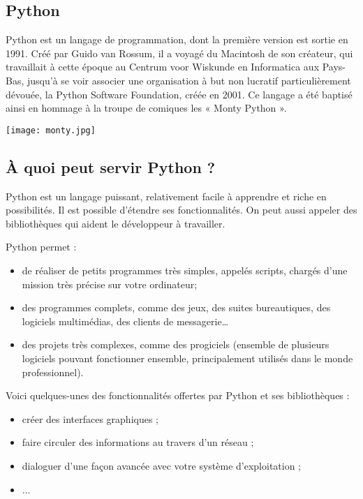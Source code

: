 \subsection{Python}
\begin{minipage}[c]{.79\linewidth}

Python est un langage de programmation, dont la première version est sortie en 1991. Créé par Guido van Rossum, il a voyagé du Macintosh de son créateur, qui travaillait à cette époque au Centrum voor Wiskunde en Informatica aux Pays-Bas, jusqu'à se voir associer une organisation à but non lucratif particulièrement dévouée, la Python Software Foundation, créée en 2001. Ce langage a été baptisé ainsi en hommage à la troupe de comiques les « Monty Python ».
\end{minipage} \hfill
\begin{minipage}[c]{.2\linewidth}
\begin{center}
\texttt{[image: monty.jpg]}
\end{center}
\end{minipage}

\subsection{À quoi peut servir Python ?}




Python est un langage puissant, relativement facile à apprendre et riche en possibilités. Il est possible d'étendre ses fonctionnalités. On peut aussi appeler des bibliothèques qui aident le développeur à travailler. 

Python permet :
\begin{itemize}
\item de réaliser de petits programmes très simples, appelés scripts, chargés d'une mission très précise sur votre ordinateur;
\item des programmes complets, comme des jeux, des suites bureautiques, des logiciels multimédias, des clients de messagerie…
\item des projets très complexes, comme des progiciels (ensemble de plusieurs logiciels pouvant fonctionner ensemble, principalement utilisés dans le monde professionnel).
\end{itemize}

Voici quelques-unes des fonctionnalités offertes par Python et ses bibliothèques :
\begin{itemize}
\item créer des interfaces graphiques ;
\item faire circuler des informations au travers d'un réseau ;
\item dialoguer d'une façon avancée avec votre système d'exploitation ;
\item ...
\end{itemize}


